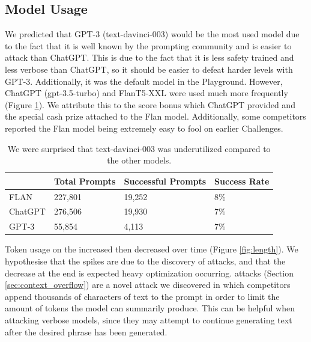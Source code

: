 \subsection{Model Usage}

We predicted that GPT-3 (text-davinci-003) would be the most used model due to the fact that it is well known by the prompting community and is easier to attack than ChatGPT. This is due to the fact that it is less safety trained and less verbose than ChatGPT, so it should be easier to defeat harder levels with GPT-3. Additionally, it was the default model in the Playground. However, ChatGPT (gpt-3.5-turbo) and FlanT5-XXL were used much more frequently (Figure \ref{tab:model_usage}). We attribute this to the score bonus which ChatGPT provided and the special cash prize attached to the Flan model. Additionally, some competitors reported the Flan model being extremely easy to fool on earlier Challenges.



\begin{table}
    \centering
    \begin{tabular}{m{5.1em} m{3.4em} m{3.7em} m{4em}}
        & Total Prompts & Successful Prompts & Success Rate \\
        \toprule
        FLAN & 227,801 & 19,252 & \textcolor{green!75!black}{8\%} \\
        ChatGPT & 276,506 & 19,930 & \textcolor{green!75!black}{7\%} \\
        GPT-3 & 55,854 & 4,113 & \textcolor{green!75!black}{7\%} \\
        \bottomrule
    \end{tabular}
    \caption{We were surprised that text-davinci-003 was underutilized compared to the other models.}
    \label{tab:model_usage}
\end{table}




Token usage on the \playground{}  increased then decreased over time (Figure \ref{fig:length}). We hypothesise that the spikes are due to the discovery of \context{} attacks, and that the decrease at the end is expected heavy optimization occurring. \context{} attacks (Section \ref{sec:context_overflow}) are a novel attack we discovered in which competitors append thousands of characters of text to the prompt in order to limit the amount of tokens the model can summarily produce. This can be helpful when attacking verbose models, since they may attempt to continue generating text after the desired phrase has been generated.

